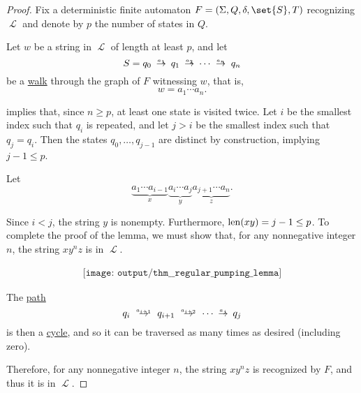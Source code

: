 \begin{proof}
  Fix a deterministic finite automaton \( F = (\Sigma, Q, \delta, \set{ S }, T) \) recognizing \( \mscrL \) and denote by \( p \) the number of states in \( Q \).

  Let \( w \) be a string in \( \mscrL \) of length at least \( p \), and let
  \begin{equation*}
    S = q_0 \reloset {a_1} \to q_1 \reloset {a_2} \to \cdots \reloset {a_n} \to q_n
  \end{equation*}
  be a \hyperref[def:graph_walk/directed]{walk} through the graph of \( F \) witnessing \( w \), that is,
  \begin{equation*}
    w = a_1 \cdots a_n.
  \end{equation*}

   implies that, since \( n \geq p \), at least one state is visited twice. Let \( i \) be the smallest index such that \( q_i \) is repeated, and let \( j > i \) be the smallest index such that \( q_j = q_i \). Then the states \( q_0, \ldots, q_{j-1} \) are distinct by construction, implying \( j - 1 \leq p \).

  Let
  \begin{equation*}
    \underbrace{a_1 \cdots a_{i-1}}_x \underbrace{a_i \cdots a_j}_y \underbrace{a_{j+1} \cdots a_n}_z.
  \end{equation*}

  Since \( i < j \), the string \( y \) is nonempty. Furthermore, \( \operatorname{len}(xy) = j - 1 \leq p \). To complete the proof of the lemma, we must show that, for any nonnegative integer \( n \), the string \( xy^nz \) is in \( \mscrL \).

  \begin{equation*}
    \begin{aligned}
      \texttt{[image: output/thm\_\_regular\_pumping\_lemma]}
    \end{aligned}
  \end{equation*}

  The \hyperref[def:graph_walk]{path}
  \begin{equation*}
    q_i \reloset {a_{i+1}} \to q_{i+1} \reloset {a_{i+2}} \to \cdots \reloset {a_j} \to q_j
  \end{equation*}
  is then a \hyperref[def:graph_cycle]{cycle}, and so it can be traversed as many times as desired (including zero).

  Therefore, for any nonnegative integer \( n \), the string \( xy^nz \) is recognized by \( F \), and thus it is in \( \mscrL \).
\end{proof}

